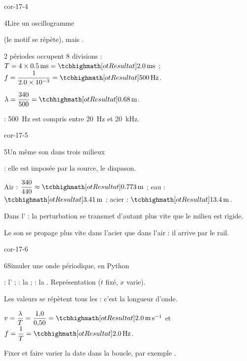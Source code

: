 \begin{blocLivre}{cor-17-4}
\begin{corrige}{4}{Lire un oscillogramme}
\begin{questions}
\item {} (le motif se répète), mais .
\item 2 périodes occupent 8 divisions : $T=4\times\qty{0,5}{ms}=\res{\qty{2,0}{ms}}$ ; $f=\dfrac{1}{\num{2,0e-3}}=\res{\qty{500}{Hz}}$.
\item $\lambda=\dfrac{340}{500}=\res{\qty{0,68}{m}}$.
\item {} : \qty{500}{Hz} est compris entre \qty{20}{Hz} et \qty{20}{kHz}.
\end{questions}
\end{corrige}
\end{blocLivre}
\begin{blocLivre}{cor-17-5}
\begin{corrige}{5}{Un même son dans trois milieux}
\begin{questions}
\item {} : elle est imposée par la source, le diapason.
\item Air : $\dfrac{340}{440}\approx\res{\qty{0,773}{m}}$ ; eau : $\res{\qty{3,41}{m}}$ ; acier : $\res{\qty{13,4}{m}}$.
\item Dans l' : la perturbation se transmet d'autant plus vite que le milieu est rigide.
\item Le son se propage plus vite dans l'acier que dans l'air : il arrive  par le rail.
\end{questions}
\end{corrige}
\end{blocLivre}
\begin{blocLivre}{cor-17-6}
\begin{corrige}{6}{Simuler une onde périodique, en Python}
\begin{questions}
\item {} : l' ;  : la  ;  : la . Représentation  ($t$ fixé, $x$ varie).
\item Les valeurs se répètent tous les  : c'est la longueur d'onde.
\item $v=\dfrac{\lambda}{T}=\dfrac{1{,}0}{0{,}50}=\res{\qty{2,0}{m.s^{-1}}}$ et $f=\dfrac{1}{T}=\res{\qty{2,0}{Hz}}$.
\item Fixer  et faire varier la date dans la boucle, par exemple .
\end{questions}
\end{corrige}
\end{blocLivre}
